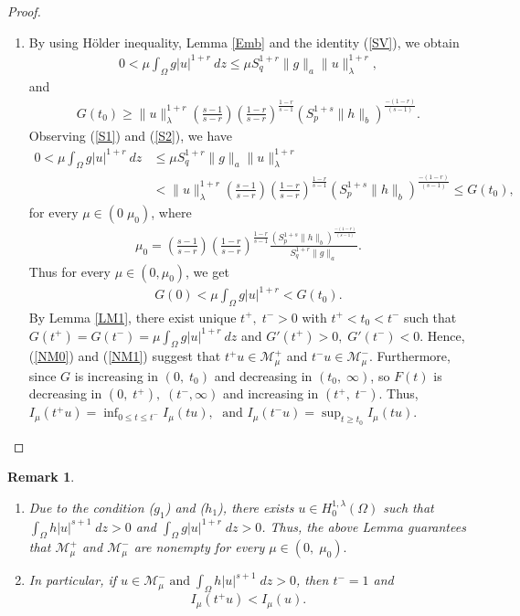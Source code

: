 \documentclass[12pt, notitlepage]{article}
\newtheorem{rmk}[theorem]{Remark}
\begin{document}
{\begin{proof}
\begin{enumerate}
$$I_\mu(t^-u)\geq \sup_{t\geq 0}\; I_\mu(tu)>0.$$
    \item [($b$)] By using H\"{o}lder inequality, Lemma \ref{Emb} and the identity (\ref{SV}), we obtain
\begin{align}\label{S1}
    0<\mu\int_\Omega g|u|^{1+r}\ dz\leq\mu S_q^{1+r}\|g\|_a\|u\|^{1+r}_\lambda,
\end{align}
and
\begin{align}\label{S2}
 G(t_0)\geq \|u\|_\lambda^{1+r}\left(\frac{s-1}{s-r}\right) \left (\frac{1-r}{s-r}\right )^\frac{1-r}{s-1}\left( S_p^{1+s}\|h\|_b\right )^\frac{-(1-r)}{(s-1)}.
\end{align}
Observing (\ref{S1}) and (\ref{S2}), we have
\begin{align}
 0<\mu\int_\Omega g|u|^{1+r}\ dz&\leq\mu S_q^{1+r}\|g\|_a\|u\|^{1+r}_\lambda\nonumber\\
 &< \|u\|_\lambda^{1+r}\left(\frac{s-1}{s-r}\right) \left (\frac{1-r}{s-r}\right )^\frac{1-r}{s-1}\left( S_p^{1+s}\|h\|_b\right )^\frac{-(1-r)}{(s-1)}\leq G(t_0),
\end{align}
for every $\mu\in(0\; \mu_0)$, where
\begin{align}
    \mu_0=\left(\frac{s-1}{s-r}\right) \left (\frac{1-r}{s-r}\right )^\frac{1-r}{s-1}\frac{\left( S_p^{1+s}\|h\|_b\right )^\frac{-(1-r)}{(s-1)}}{S_q^{1+r}\|g\|_a}.
\end{align}
Thus for every $\mu\in(0,\mu_0)$, we get
\begin{align*}
    G(0)<\mu\int_\Omega g|u|^{1+r}<G(t_0).
\end{align*}
By Lemma \ref{LM1}, there exist unique $t^+,\;t^->0$ with $t^+<t_0<t^-$ such that $G(t^+)=G(t^-)=\mu\int_\Omega g|u|^{1+r} \ dz$ and $G'(t^+)>0,\;G'(t^-)<0$. Hence, (\ref{NM0}) and (\ref{NM1}) suggest that $t^+u\in\mathscr{M}_\mu^+$ and $t^-u\in\mathscr{M}_\mu^-$. Furthermore, since $G$ is increasing in $(0,\;t_0)$ and decreasing in $(t_0,\;\infty)$, so $F(t)$ is decreasing in $(0,\;t^+),\; (t^-,\infty)$ and increasing in $(t^+,\;t^-)$. Thus, $I_\mu(t^+u)=\inf_{0\leq t\leq t^-}I_\mu(tu),\; \text{ and } I_\mu(t^-u)=\sup_{t\geq t_0}I_\mu(tu).$

\end{enumerate}
\end{proof}

\begin{rmk}\label{IMR}
    \begin{enumerate}
        \item[(i)] Due to the condition ($g_1$) and ($h_1$), there exists $u\in H^{1,\lambda}_0(\Omega)$ such that $\int_\Omega h|u|^{s+1}\; dz>0$ and $\int_\Omega g|u|^{1+r}\;dz>0$. Thus, the above Lemma guarantees that $\mathscr{M}^+_\mu$ and $\mathscr{M}^-_\mu$ are nonempty for every $\mu\in(0,\;\mu_0).$
        \item[(ii)] In particular, if $u\in\mathcal{M}^-_\mu\;\mbox{and}\;\int_\Omega h|u|^{s+1}\; dz>0$, then $t^-=1$ and $$I_\mu(t^+u)<I_\mu(u).$$
    \end{enumerate}
\end{rmk}


}
\end{document}
